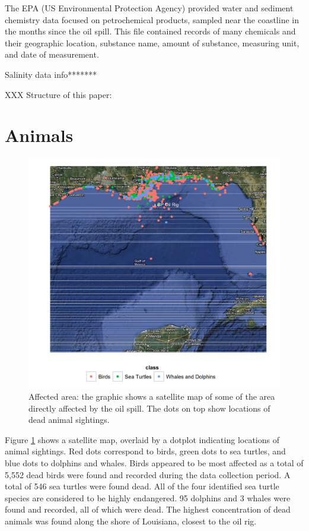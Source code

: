 \documentclass[11pt]{article}
\begin{document}
The EPA (US Environmental  Protection Agency) provided water and sediment chemistry data focused on petrochemical products, sampled near the coastline in the months since the oil spill. This file contained records of many chemicals and their geographic location, substance name, amount of substance, measuring unit, and date of measurement. 

Salinity data info*******


XXX Structure of this paper:
\section{Animals}

\begin{figure}[htbp] %
   \centering
   \includegraphics[width=4.5in]{animal_deaths.png} 
   \caption{Affected area: the graphic shows a satellite map of some of the area directly affected by the oil spill. The dots on top show locations of dead animal sightings. }
   \label{deaths}
\end{figure}
Figure \ref{deaths} shows a satellite map, overlaid by a dotplot indicating locations of animal sightings. Red dots correspond to birds, green dots to sea turtles, and blue dots to dolphins and whales.  Birds appeared to be most affected as a total of 5,552 dead birds were found and recorded during the data collection period.  A total of 546 sea turtles were found dead.  All of the four identified sea turtle species are considered to be highly endangered.  95 dolphins and 3 whales were found and recorded, all of which were dead. The highest concentration of dead animals was found along the shore of Louisiana, closest to the oil rig.  
\end{document}
